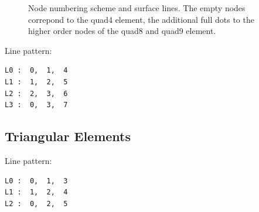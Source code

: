 \begin{figure}[h!]
\begin{center}
\caption{Node numbering scheme and surface lines. The empty nodes correpond to the quad4 element, the additional full dots to the higher order nodes of the quad8 and quad9 element.}
\label{fig:conventions:2d}
\end{center}
\end{figure}

Line pattern:
\begin{verbatim}
L0 :  0,  1,  4
L1 :  1,  2,  5
L2 :  2,  3,  6
L3 :  0,  3,  7
\end{verbatim}


\subsection{Triangular Elements}

Line pattern:
\begin{verbatim}
L0 :  0,  1,  3
L1 :  1,  2,  4
L2 :  0,  2,  5
\end{verbatim}





\newpage
